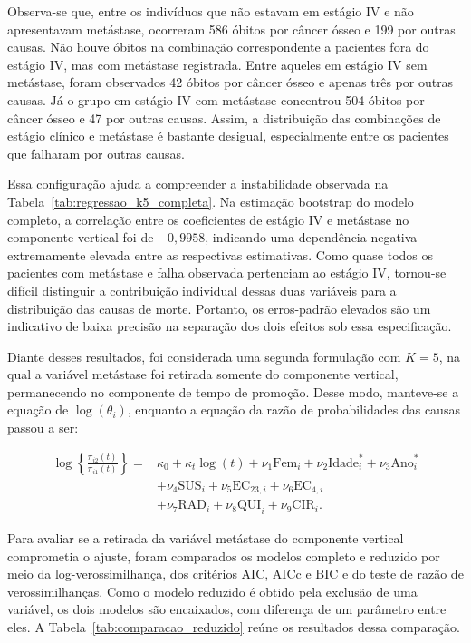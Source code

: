 \documentclass[11pt,a4paper]{article}
\begin{document}
Observa-se que, entre os indivíduos que não estavam em estágio IV e não apresentavam metástase, ocorreram 586 óbitos por câncer ósseo e 199 por outras causas. Não houve óbitos na combinação correspondente a pacientes fora do estágio IV, mas com metástase registrada. Entre aqueles em estágio IV sem metástase, foram observados 42 óbitos por câncer ósseo e apenas três por outras causas. Já o grupo em estágio IV com metástase concentrou 504 óbitos por câncer ósseo e 47 por outras causas. Assim, a distribuição das combinações de estágio clínico e metástase é bastante desigual, especialmente entre os pacientes que falharam por outras causas.

Essa configuração ajuda a compreender a instabilidade observada na Tabela~\ref{tab:regressao_k5_completa}. Na estimação bootstrap do modelo completo, a correlação entre os coeficientes de estágio IV e metástase no componente vertical foi de $-0{,}9958$, indicando uma dependência negativa extremamente elevada entre as respectivas estimativas. Como quase todos os pacientes com metástase e falha observada pertenciam ao estágio IV, tornou-se difícil distinguir a contribuição individual dessas duas variáveis para a distribuição das causas de morte. Portanto, os erros-padrão elevados são um indicativo de baixa precisão na separação dos dois efeitos sob essa especificação.

Diante desses resultados, foi considerada uma segunda formulação com $K=5$, na qual a variável metástase foi retirada somente do componente vertical, permanecendo no componente de tempo de promoção. Desse modo, manteve-se a equação de $\log(\theta_i)$, enquanto a equação da razão de probabilidades das causas passou a ser:

\begin{equation}
\begin{aligned}
\log\!\left\{\frac{\pi_{i2}(t)}{\pi_{i1}(t)}\right\}
={}&\kappa_0+\kappa_t\log(t)+\nu_1\mathrm{Fem}_i
+\nu_2\mathrm{Idade}_i^*+\nu_3\mathrm{Ano}_i^*\\
&+\nu_4\mathrm{SUS}_i+\nu_5\mathrm{EC}_{23,i}
+\nu_6\mathrm{EC}_{4,i}\\
&+\nu_7\mathrm{RAD}_i+\nu_8\mathrm{QUI}_i
+\nu_9\mathrm{CIR}_i.
\end{aligned}
\label{eq:aplicacao_vertical_reduzido}
\end{equation}

Para avaliar se a retirada da variável metástase do componente vertical comprometia o ajuste, foram comparados os modelos completo e reduzido por meio da log-verossimilhança, dos critérios AIC, AICc e BIC e do teste de razão de verossimilhanças. Como o modelo reduzido é obtido pela exclusão de uma variável, os dois modelos são encaixados, com diferença de um parâmetro entre eles. A Tabela~\ref{tab:comparacao_reduzido} reúne os resultados dessa comparação.
\end{document}
